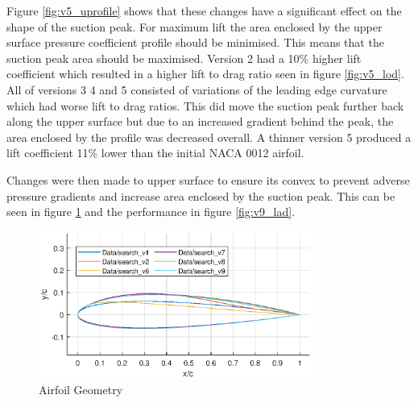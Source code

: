 \documentclass{article}
\begin{document}
Figure \ref{fig:v5_uprofile} shows that these changes have a significant effect on the shape of the suction peak.
For maximum lift the area enclosed by the upper surface pressure coefficient profile should be minimised.
This means that the suction peak area should be maximised.
Version 2 had a 10\% higher lift coefficient which resulted in a higher lift to drag ratio seen in figure \ref{fig:v5_lod}.
All of versions 3 4 and 5 consisted of variations of the leading edge curvature which had worse lift to drag ratios.
This did move the suction peak further back along the upper surface but due to an increased gradient behind the peak,
the area enclosed by the profile was decreased overall.
A thinner version 5 produced a lift coefficient 11\% lower than the initial NACA 0012 airfoil.

Changes were then made to upper surface to ensure its convex to prevent adverse pressure gradients and increase area enclosed by the suction peak.
This can be seen in figure \ref{fig:v9_geometry} and the performance in figure \ref{fig:v9_lad}.

\begin{figure}[H]
    \centering
    \includegraphics[width=0.8\textwidth]{figures/hiRe_geometry_9.eps}
    \caption{Airfoil Geometry}
    \label{fig:v9_geometry}
\end{figure}
\end{document}
